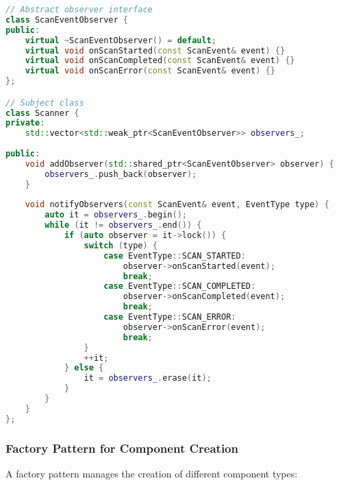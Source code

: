 \begin{lstlisting}[language=C++, caption=Observer Pattern for Events]
// Abstract observer interface
class ScanEventObserver {
public:
    virtual ~ScanEventObserver() = default;
    virtual void onScanStarted(const ScanEvent& event) {}
    virtual void onScanCompleted(const ScanEvent& event) {}
    virtual void onScanError(const ScanEvent& event) {}
};

// Subject class
class Scanner {
private:
    std::vector<std::weak_ptr<ScanEventObserver>> observers_;
    
public:
    void addObserver(std::shared_ptr<ScanEventObserver> observer) {
        observers_.push_back(observer);
    }
    
    void notifyObservers(const ScanEvent& event, EventType type) {
        auto it = observers_.begin();
        while (it != observers_.end()) {
            if (auto observer = it->lock()) {
                switch (type) {
                    case EventType::SCAN_STARTED:
                        observer->onScanStarted(event);
                        break;
                    case EventType::SCAN_COMPLETED:
                        observer->onScanCompleted(event);
                        break;
                    case EventType::SCAN_ERROR:
                        observer->onScanError(event);
                        break;
                }
                ++it;
            } else {
                it = observers_.erase(it);
            }
        }
    }
};
\end{lstlisting}

\subsubsection{Factory Pattern for Component Creation}

A factory pattern manages the creation of different component types:

